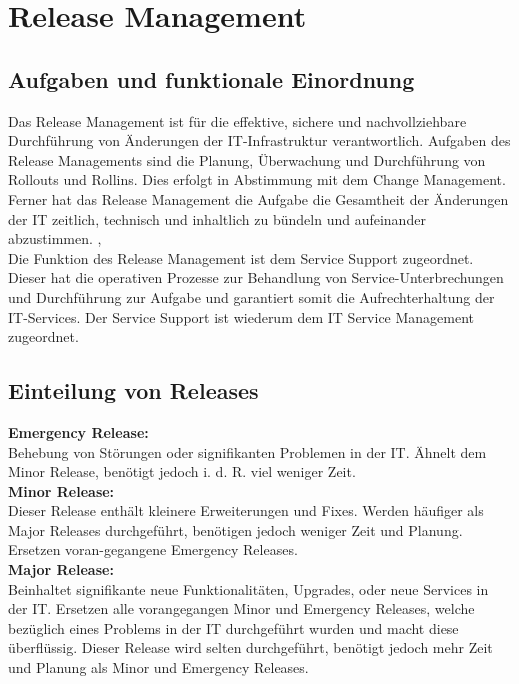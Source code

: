 \chapter{Release Management}
\section{Aufgaben und funktionale Einordnung}
Das Release Management ist für die effektive, sichere und nachvollziehbare Durchführung von Änderungen der IT-Infrastruktur verantwortlich. Aufgaben des Release Managements sind die Planung, Überwachung und Durchführung von Rollouts und Rollins. Dies erfolgt in Abstimmung mit dem Change Management.  Ferner hat das Release Management die Aufgabe die Gesamtheit der Änderungen der IT zeitlich, technisch und inhaltlich zu bündeln und aufeinander abzustimmen. \cite{wiki-it}, \cite{rm-pilorget}
\\
Die Funktion des Release Management ist dem Service Support zugeordnet. Dieser hat die operativen Prozesse zur Behandlung von Service-Unterbrechungen und Durchführung zur Aufgabe und garantiert somit die Aufrechterhaltung der IT-Services. Der Service Support ist wiederum dem IT Service Management zugeordnet.  \cite{wiki-it-service}

\section{Einteilung von Releases}
\textbf{Emergency Release:}
\\
Behebung von Störungen oder signifikanten Problemen in der IT. Ähnelt dem Minor Release, benötigt jedoch \acs{i. d. R.} viel weniger Zeit.
\\
\textbf{Minor Release:}
\\
Dieser Release enthält kleinere Erweiterungen und Fixes. Werden häufiger als Major Releases durchgeführt, benötigen jedoch weniger Zeit und Planung. Ersetzen voran-gegangene Emergency Releases. 
\\
\textbf{Major Release:}
\\
Beinhaltet signifikante neue Funktionalitäten, Upgrades, oder neue Services in der IT. Ersetzen alle vorangegangen Minor und Emergency Releases, welche bezüglich eines Problems in der IT durchgeführt wurden und macht diese überflüssig. Dieser Release wird selten durchgeführt, benötigt jedoch mehr Zeit und Planung als Minor und Emergency Releases.
\cite{rm-howard}
